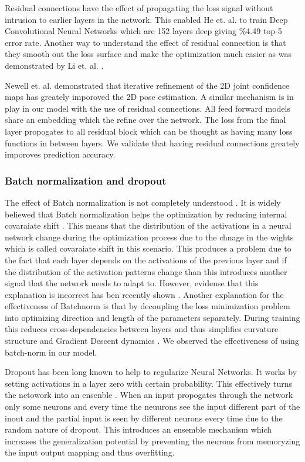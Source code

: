 Residual connections have the effect of propagating the loss signal without intrusion to earlier layers in the network. This enabled He et. al. \parencite{he2016deep} to train Deep Convolutional Neural Networks which are  152 layers deep giving \%4.49 top-5 error rate. Another way to understand the effect of residual connection is that they smooth out the loss surface and make the optimization much easier as was demonstrated by Li et. al. \parencite{li2017visualizing}.

Newell et. al. \parencite{newell2016stacked} demonstrated that iterative refinement of the 2D joint confidence maps has greately imporoved the 2D pose estimation. A similar mechanism is in play in our model with the use of residual connections. All feed forward models share an embedding which the refine over the network. The loss from the final layer propogates to all residual block which can be thought as having many loss functions in between layers. We validate that having residual connections greately imporoves prediction accuracy.   

\subsubsection{Batch normalization and dropout}

The effect of Batch normalization \parencite{ioffe2015batch} is not completely understood \parencite{kohler2018towards}. It is widely beliewed that Batch normalization helps the optimization by reducing internal covaraiate shift \parencite{ioffe2015batch}. This means that the distribution of the activations in a neural network change during the optimization process due to the chnage in the wights which is called covaraiate shift in this scenario. This produces a problem due to the fact that each layer depends on the activations of the previous layer and if the distribution of the activation patterns change than this introduces another signal that the network needs to adapt to. However, evidense that this explanation is incorrect has ben recently shown \parencite{santurkar2018does}. Another explanation for the effectiveness of Batchnorm is that by decoupling the loss minimization problem into optimizing direction and length of the parameters separately. During training this reduces cross-dependencies between layers and thus simplifies curvature structure and Gradient Descent dynamics \parencite{kohler2018towards}. We observed the effectiveness of using batch-norm in our model.

Dropout \parencite{srivastava2014dropout} has been long known to help to regularize Neural Networks. It works by setting activations in a layer zero with certain probability. This effectively turns the netowork into an ensenble \parencite{hara2016analysis}. When an input propogates through the network only some neurons and every time the neuurons see the input different part of the inout and the partial input is seen by different neurons every time due to the random nature of dropout. This introduces an ensemble mechanism which increases the generalization potential by preventing the neurons from memoryzing the input output mapping and thus overfitting. 

